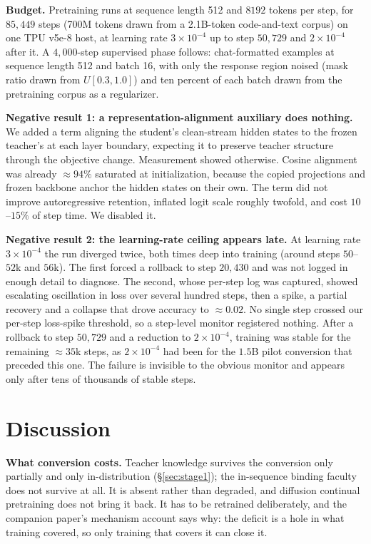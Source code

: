 \documentclass{article}
\begin{document}
\textbf{Budget.} Pretraining runs at sequence length 512 and $8192$ tokens per step, for $85{,}449$ steps (700M tokens drawn from a 2.1B-token code-and-text corpus) on one TPU v5e-8 host, at learning rate $3{\times}10^{-4}$ up to step $50{,}729$ and $2{\times}10^{-4}$ after it. A $4{,}000$-step supervised phase follows: chat-formatted examples at sequence length 512 and batch 16, with only the response region noised (mask ratio drawn from $U[0.3,1.0]$) and ten percent of each batch drawn from the pretraining corpus as a regularizer.

\textbf{Negative result 1: a representation-alignment auxiliary does nothing.} We added a term aligning the student's clean-stream hidden states to the frozen teacher's at each layer boundary, expecting it to preserve teacher structure through the objective change. Measurement showed otherwise. Cosine alignment was already ${\approx}94\%$ saturated at initialization, because the copied projections and frozen backbone anchor the hidden states on their own. The term did not improve autoregressive retention, inflated logit scale roughly twofold, and cost $10$--$15\%$ of step time. We disabled it.

\textbf{Negative result 2: the learning-rate ceiling appears late.} At learning rate $3{\times}10^{-4}$ the run diverged twice, both times deep into training (around steps $50$--$52$k and $56$k). The first forced a rollback to step $20{,}430$ and was not logged in enough detail to diagnose. The second, whose per-step log was captured, showed escalating oscillation in loss over several hundred steps, then a spike, a partial recovery and a collapse that drove accuracy to ${\approx}0.02$. No single step crossed our per-step loss-spike threshold, so a step-level monitor registered nothing. After a rollback to step $50{,}729$ and a reduction to $2{\times}10^{-4}$, training was stable for the remaining ${\approx}35$k steps, as $2{\times}10^{-4}$ had been for the $1.5$B pilot conversion that preceded this one. The failure is invisible to the obvious monitor and appears only after tens of thousands of stable steps.

\section{Discussion}\label{sec:discussion}

\textbf{What conversion costs.} Teacher knowledge survives the conversion only partially and only in-distribution (\S\ref{sec:stage1}); the in-sequence binding faculty does not survive at all. It is absent rather than degraded, and diffusion continual pretraining does not bring it back. It has to be retrained deliberately, and the companion paper's mechanism account \citep{anatomyrecall} says why: the deficit is a hole in what training covered, so only training that covers it can close it.
\end{document}
